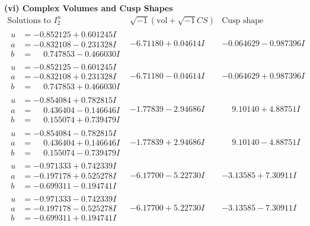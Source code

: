 \documentclass[1p]{elsarticle_modified}
\theoremstyle{definition}
\newcommand{\I}{\sqrt{-1}}
\begin{document}
\newpage\flushleft \textbf{(vi) Complex Volumes and Cusp Shapes}
$$\begin{array}{c|c|c}  
\text{Solutions to }I^u_{2}& \I (\text{vol} + \sqrt{-1}CS) & \text{Cusp shape}\\
 \hline 
\begin{aligned}
u &= -0.852125 + 0.601245 I \\
a &= -0.832108 - 0.231328 I \\
b &= \phantom{-}0.747853 - 0.466030 I\end{aligned}
 & -6.71180 + 0.04614 I & -0.064629 - 0.987396 I \\ \hline\begin{aligned}
u &= -0.852125 - 0.601245 I \\
a &= -0.832108 + 0.231328 I \\
b &= \phantom{-}0.747853 + 0.466030 I\end{aligned}
 & -6.71180 - 0.04614 I & -0.064629 + 0.987396 I \\ \hline\begin{aligned}
u &= -0.854084 + 0.782815 I \\
a &= \phantom{-}0.436404 - 0.146646 I \\
b &= \phantom{-}0.155074 + 0.739479 I\end{aligned}
 & -1.77839 - 2.94686 I & \phantom{-}9.10140 + 4.88751 I \\ \hline\begin{aligned}
u &= -0.854084 - 0.782815 I \\
a &= \phantom{-}0.436404 + 0.146646 I \\
b &= \phantom{-}0.155074 - 0.739479 I\end{aligned}
 & -1.77839 + 2.94686 I & \phantom{-}9.10140 - 4.88751 I \\ \hline\begin{aligned}
u &= -0.971333 + 0.742339 I \\
a &= -0.197178 + 0.525278 I \\
b &= -0.699311 - 0.194741 I\end{aligned}
 & -6.17700 - 5.22730 I & -3.13585 + 7.30911 I \\ \hline\begin{aligned}
u &= -0.971333 - 0.742339 I \\
a &= -0.197178 - 0.525278 I \\
b &= -0.699311 + 0.194741 I\end{aligned}
 & -6.17700 + 5.22730 I & -3.13585 - 7.30911 I \\ \hline\begin{aligned}

\end{aligned}
\end{array}$$
\end{document}

